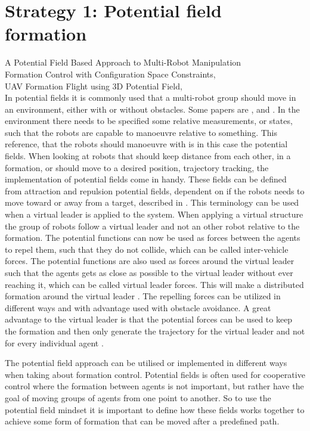 \section{Strategy 1: Potential field formation}
A Potential Field Based Approach to Multi-Robot Manipulation \citep{pfmrm}\\
Formation Control with Configuration Space Constraints, \citep{fccsc}\\
UAV Formation Flight using 3D Potential Field, \citep{UAVff3dpf}\\

In potential fields it is commonly used that a multi-robot group should move in an environment, either with or without obstacles. Some papers are \citep{pfmrm}, \citep{fccsc} and \citep{UAVff3dpf}. In the environment there needs to be specified some relative measurements, or states, such that the robots are capable to manoeuvre relative to something. This reference, that the robots should manoeuvre with is in this case the potential fields. When looking at robots that should keep distance from each other, in a formation, or should move to a desired position, trajectory tracking, the implementation of potential fields come in handy. These fields can be defined from attraction and repulsion potential fields, dependent on if the robots needs to move toward or away from a target, described in \citep{PS:02}. This terminology can be used when a virtual leader is applied to the system. When applying a virtual structure the group of robots follow a virtual leader and not an other robot relative to the formation. The potential functions can now be used as forces between the agents to repel them, such that they do not collide, which can be called inter-vehicle forces. The potential functions are also used as forces around the virtual leader such that the agents gets as close as possible to the virtual leader without ever reaching it, which can be called virtual leader forces. This will make a distributed formation around the virtual leader \citep{1655803}. The repelling forces can be utilized in different ways and with advantage used with obstacle avoidance. A great advantage to the virtual leader is that the potential forces can be used to keep the formation and then only generate the trajectory for the virtual leader and not for every individual agent \citep{1655803}.

The potential field approach can be utilised or implemented in
different ways when taking about formation control. Potential fields
is often used for cooperative control where the formation between
agents is not important, but rather have the goal of moving groups of
agents from one point to another.  So to
use the potential field mindset it is important to define how these
fields works together to achieve some form of formation that can be
moved after a predefined path. 

